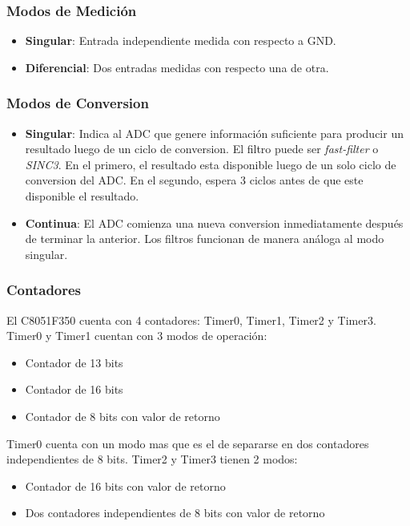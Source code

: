 \documentclass{article}
\theoremstyle{definition}
\theoremstyle{remark}
\begin{document}
\subsubsection{Modos de Medición} %
\label{ssub:modos_de_medicion}

\begin{itemize}
  \item \textbf{Singular}: Entrada independiente medida con respecto a GND.
  \item \textbf{Diferencial}: Dos entradas medidas con respecto una de otra.
\end{itemize}


\subsubsection{Modos de Conversion} %
\label{ssub:modos_de_conversion}

\begin{itemize}
  \item \textbf{Singular}: Indica al ADC que genere información suficiente para producir un resultado luego de un ciclo de conversion. El filtro puede ser \emph{fast-filter} o \emph{SINC3}. En el primero, el resultado esta disponible luego de un solo ciclo de conversion del ADC. En el segundo, espera 3 ciclos antes de que este disponible el resultado.
  \item \textbf{Continua}: El ADC comienza una nueva conversion inmediatamente después de terminar la anterior. Los filtros funcionan de manera análoga al modo singular.
\end{itemize}


\subsubsection{Contadores} %
\label{ssub:contadores}

El C8051F350 cuenta con 4 contadores: Timer0, Timer1, Timer2 y Timer3. Timer0 y Timer1 cuentan con 3 modos de operación:
\begin{itemize}
  \item Contador de 13 bits
  \item Contador de 16 bits
  \item Contador de 8 bits con valor de retorno
\end{itemize}
Timer0 cuenta con un modo mas que es el de separarse en dos contadores independientes de 8 bits.
Timer2 y Timer3 tienen 2 modos:
 \begin{itemize}
   \item Contador de 16 bits con valor de retorno
   \item Dos contadores independientes de 8 bits con valor de retorno
 \end{itemize}
\end{document}
